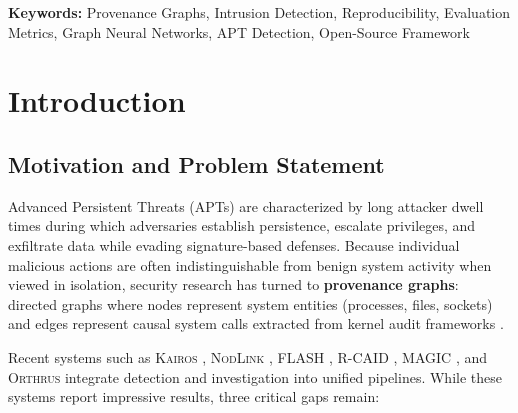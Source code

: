 \documentclass[11pt,a4paper]{article}
\newcommand{\system}[1]{\textsc{#1}}
\begin{document}
\textbf{Keywords:} Provenance Graphs, Intrusion Detection, Reproducibility, Evaluation Metrics, Graph Neural Networks, APT Detection, Open-Source Framework

\newpage
\tableofcontents
\newpage

\section{Introduction}
\label{sec:introduction}

\subsection{Motivation and Problem Statement}

Advanced Persistent Threats (APTs) are characterized by long attacker dwell times during which adversaries establish persistence, escalate privileges, and exfiltrate data while evading signature-based defenses. Because individual malicious actions are often indistinguishable from benign system activity when viewed in isolation, security research has turned to \textbf{provenance graphs}: directed graphs where nodes represent system entities (processes, files, sockets) and edges represent causal system calls extracted from kernel audit frameworks \cite{han2020unicorn, milajerdi2019holmes}.

Recent systems such as \system{Kairos} \cite{cheng2024kairos}, \system{NodLink} \cite{li2024nodlink}, \system{FLASH} \cite{rehman2024flash}, \system{R-CAID} \cite{goyal2024rcaid}, \system{MAGIC} \cite{jia2024magic}, and \system{Orthrus} \cite{jiang2025orthrus} integrate detection and investigation into unified pipelines. While these systems report impressive results, three critical gaps remain:
\end{document}
